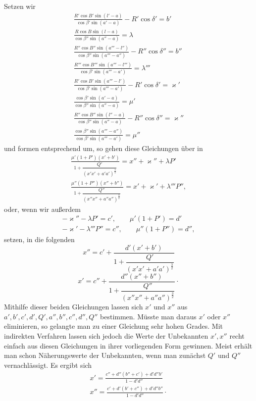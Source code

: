 Setzen wir
\[
\begin{gathered}
\frac{R'\cos B'\sin(l'-a)}{\cos\beta'\sin(a'-a)}-R'\cos\delta'=b'\\[.7em]
\frac{R\cos B\sin(l-a)}{\cos\beta''\sin(a''-a)}=\lambda\\[.7em]
\frac{R''\cos B''\sin(a'''-l'')}{\cos\beta''\sin(a'''-a'')}-R''\cos\delta''=b''\\[.7em]
\frac{R'''\cos B'''\sin(a'''-l''')}{\cos\beta'\sin(a'''-a')}=\lambda'''\\[.7em]
\frac{R'\cos B'\sin(a'''-l')}{\cos\beta'\sin(a'''-a')}-R'\cos\delta'=\varkappa'\\[.7em]
\frac{\cos\beta'\sin(a'-a)}{\cos\beta''\sin(a''-a)}=\mu'\\[.7em]
\frac{R''\cos B''\sin(l''-a)}{\cos\beta''\sin(a''-a)}-R''\cos\delta''=\varkappa''\\[.7em]
\frac{\cos\beta''\sin(a'''-a'')}{\cos\beta'\sin(a'''-a')}=\mu''
\end{gathered}
\]
und formen entsprechend um, so gehen diese Gleichungen über in
\[
\begin{gathered}
\frac{\mu'(1+P')(x'+b')}{1+\dfrac{Q'}{(x'x'+a'a')^{\frac32}}}=x''+\varkappa''+\lambda P'\\[1em]
\frac{\mu''(1+P'')(x''+b'')}{1+\dfrac{Q''}{(x''x''+a''a'')^{\frac32}}}=x'+\varkappa'+\lambda'''P'',
\end{gathered}
\]
oder, wenn wir außerdem
\[
\begin{gathered}
-\varkappa''-\lambda P'=c',\qquad\mu'(1+P')=d'\\[.5em]
-\varkappa'-\lambda'''P''=c'',\qquad\mu''(1+P'')=d'',
\end{gathered}
\]
setzen, in die folgenden
\[
\tag*{I.}x''=c'+\frac{d'(x'+b')}{1+\dfrac{Q'}{(x'x'+a'a')^{\frac32}}}
\]
\[
\tag*{II.}x'=c''+\frac{d''(x''+b'')}{1+\dfrac{Q''}{(x''x''+a''a'')^{\frac32}}}\mathpunct{\cdot}
\]
Mithilfe dieser beiden Gleichungen lassen sich $x'$ und $x''$ aus \newline $a',b',c',d',Q',a'',b'',c'',d'',Q''$ bestimmen. Müsste man daraus $x'$ oder $x''$ eliminieren, so gelangte man zu einer Gleichung sehr hohen Grades\HistoricalNoteEight{Handschriftliche Bemerkung:] vom Grad $64^{\mathrm{ti}}$.}. Mit indirekten Verfahren lassen sich jedoch die Werte der Unbekannten $x',x''$ recht einfach aus diesen Gleichungen in ihrer vorliegenden Form gewinnen. Meist erhält man schon Näherungswerte der Unbekannten, wenn man zunächst $Q'$ und $Q''$ vernachlässigt. Es ergibt sich
\[
\begin{gathered}
x'=\frac{c''+d''(b''+c')+d'd''b'}{1-d'd''}\\[.6em]
x''=\frac{c'+d'(b'+c'')+d'd''b''}{1-d'd''}\mathpunct{\cdot}
\end{gathered}
\]
